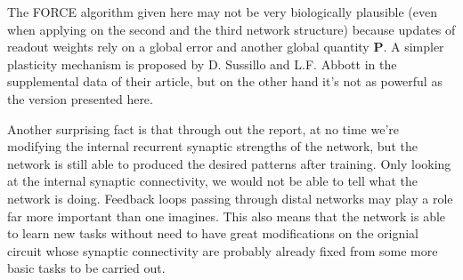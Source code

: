 The FORCE algorithm given here may not be very biologically plausible
(even when applying on the second and the third network structure)
because updates of readout weights rely on a global error and another
global quantity $\mathbf{P}$. A simpler plasticity mechanism is proposed 
by D. Sussillo and L.F. Abbott in the supplemental data of their article,
but on the other hand it's not as powerful as the version presented here.

Another surprising fact is that through out the report, at no time we're
modifying the internal recurrent synaptic strengths of the network, but
the network is still able to produced the desired patterns after training.
Only looking at the internal synaptic connectivity, we would not be able
to tell what the network is doing. Feedback loops passing through distal
networks may play a role far more important than one imagines. This
also means that the network is able to learn new tasks without need to
have great modifications on the orignial circuit whose synaptic
connectivity are probably already fixed from some more basic tasks to
be carried out.
